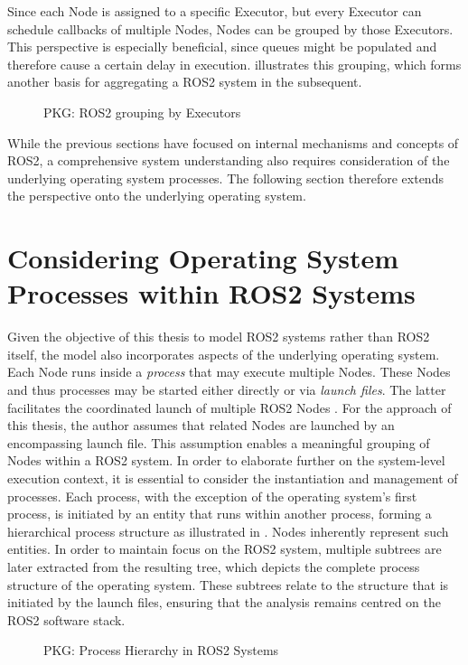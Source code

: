     Since each Node is assigned to a specific Executor, but every Executor can schedule callbacks of multiple Nodes, Nodes can be grouped by those Executors. This perspective is especially beneficial, since queues might be populated and therefore cause a certain delay in execution.  illustrates this grouping, which forms another basis for aggregating a ROS2 system in the subsequent.
    \begin{figure}[h]
        \centering
        
        \caption[Executors within ROS2]{PKG: ROS2 grouping by Executors} \label{fig:tikz:PKG:Executors}
    \end{figure}

\enlargethispage{2\baselineskip}
    While the previous sections have focused on internal mechanisms and concepts of ROS2, a comprehensive system understanding also requires consideration of the underlying operating system processes. The following section therefore extends the perspective onto the underlying operating system.

\section{Considering Operating System Processes within ROS2 Systems} \label{sec:model:processes}
    Given the objective of this thesis to model ROS2 systems rather than ROS2 itself, the model also incorporates aspects of the underlying operating system. Each Node runs inside a \emph{process} that may execute multiple Nodes.
    These Nodes and thus processes may be started either directly or via \emph{launch files}. The latter facilitates the coordinated launch of multiple ROS2 Nodes \cite{website:launch}. For the approach of this thesis, the author assumes that related Nodes are launched by an encompassing launch file. This assumption enables a meaningful grouping of Nodes within a ROS2 system. \newline
    In order to elaborate further on the system-level execution context, it is essential to consider the instantiation and management of processes.
    Each process, with the exception of the operating system's first process, is initiated by an entity that runs within another process, forming a hierarchical process structure as illustrated in . Nodes inherently represent such entities.
    In order to maintain focus on the ROS2 system, multiple subtrees are later extracted from the resulting tree, which depicts the complete process structure of the operating system. These subtrees relate to the structure that is initiated by the launch files, ensuring that the analysis remains centred on the ROS2 software stack.
    \begin{figure}[h]
        \centering
        
        \caption[Process Hierarchy in ROS2 Systems]{PKG: Process Hierarchy in ROS2 Systems} \label{fig:tikz:PKG:Processes}
    \end{figure}

